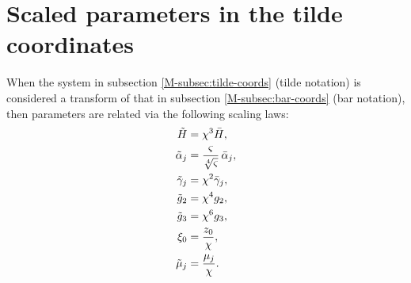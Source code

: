\documentclass[11pt,a4paper]{article}
\begin{document}
\section{Scaled parameters in the tilde coordinates}
\label{app:scaled-params}
When the system in subsection \ref*{M-subsec:tilde-coords} (tilde notation) is considered a transform of that in subsection \ref*{M-subsec:bar-coords} (bar notation), then parameters are related via the following scaling laws:
\begin{align}
\tilde{H} &= \chi^3\bar{H}, \\
\tilde{\alpha}_j &= \frac{\varsigma}{\sqrt[4]{\varsigma}}\,\bar{\alpha}_j, \notag \\
\tilde{\gamma}_j &= \chi^2\bar{\gamma}_j, \notag \\
\tilde{g}_2 &= \chi^4 g_2, \notag \\
\tilde{g}_3 &= \chi^6 g_3, \notag \\
\xi_0 &= \frac{z_0}{\chi}, \notag \\
\tilde{\mu}_j &= \frac{\mu_j}{\chi}.
\end{align}
\end{document}
